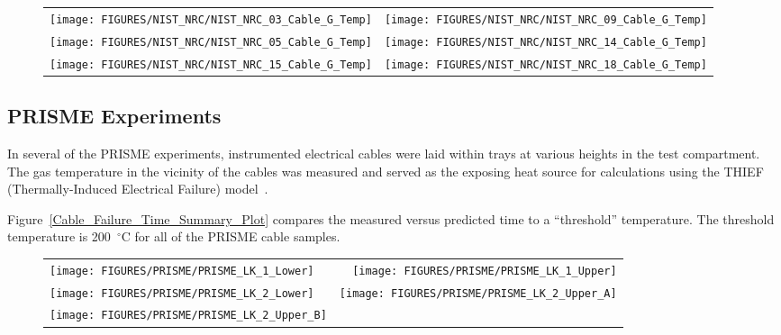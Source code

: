 \begin{figure}[p]
\begin{tabular*}{\textwidth}{l@{\extracolsep{\fill}}r}
\texttt{[image: FIGURES/NIST\_NRC/NIST\_NRC\_03\_Cable\_G\_Temp]} &
\texttt{[image: FIGURES/NIST\_NRC/NIST\_NRC\_09\_Cable\_G\_Temp]} \\
\texttt{[image: FIGURES/NIST\_NRC/NIST\_NRC\_05\_Cable\_G\_Temp]} &
\texttt{[image: FIGURES/NIST\_NRC/NIST\_NRC\_14\_Cable\_G\_Temp]} \\
\texttt{[image: FIGURES/NIST\_NRC/NIST\_NRC\_15\_Cable\_G\_Temp]} &
\texttt{[image: FIGURES/NIST\_NRC/NIST\_NRC\_18\_Cable\_G\_Temp]}
\end{tabular*}
\label{NIST_NRC_Cable_G_Open}
\end{figure}

\clearpage


\subsection{PRISME Experiments}

In several of the PRISME experiments, instrumented electrical cables were laid within trays at various heights in the test compartment. The gas temperature in the vicinity of the cables was measured and served as the exposing heat source for calculations using the THIEF (Thermally-Induced Electrical Failure) model~\cite{Dreisbach:Interflam}.

Figure~\ref{Cable_Failure_Time_Summary_Plot} compares the measured versus predicted time to a ``threshold'' temperature. The threshold temperature is 200~$^\circ$C for all of the PRISME cable samples.


\begin{figure}[h!]
\begin{tabular*}{\textwidth}{l@{\extracolsep{\fill}}r}
\texttt{[image: FIGURES/PRISME/PRISME\_LK\_1\_Lower]} &
\texttt{[image: FIGURES/PRISME/PRISME\_LK\_1\_Upper]} \\
\texttt{[image: FIGURES/PRISME/PRISME\_LK\_2\_Lower]} &
\texttt{[image: FIGURES/PRISME/PRISME\_LK\_2\_Upper\_A]} \\
\texttt{[image: FIGURES/PRISME/PRISME\_LK\_2\_Upper\_B]} &

\end{tabular*}
\label{PRISME_1}
\end{figure}

\newpage

